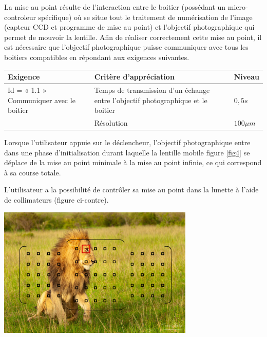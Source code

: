 La mise au point résulte de l'interaction entre le boitier (possédant un micro-controleur spécifique) où se situe
tout le traitement de numérisation de l'image (capteur CCD et programme
de mise au point) et l'objectif photographique qui permet de mouvoir la
lentille. Afin de réaliser correctement cette mise au point, il est
nécessaire que l'objectif photographique puisse communiquer avec tous
les boitiers compatibles en répondant aux exigences suivantes.

\begin{tabular}{|p{}|p{}|p{}|}
\hline 
\textbf{Exigence} & \textbf{Critère d'appréciation} & \textbf{Niveau} \\ 
\hline 
Id = « 1.1 » Communiquer avec le boitier & Temps de transmission d'un échange entre l'objectif photographique et le boitier & $0,5s$ \\ 
\cline{2-3}
& Résolution & $100\mu m$ \\ 
\hline 
\end{tabular} 


\begin{minipage}{0.4\textwidth}
Lorsque l'utilisateur appuie sur le déclencheur, l'objectif
photographique entre dans une phase d'initialisation durant laquelle la
lentille mobile figure \ref{fig4} se déplace de
la mise au point minimale à la mise au point infinie, ce qui correspond
à sa course totale.

L'utilisateur a la possibilité de contrôler sa mise au point dans la lunette à l'aide de collimateurs (figure ci-contre).
\end{minipage}
\begin{minipage}{0.6\textwidth}
\begin{center}
\includegraphics[width=0.7\textwidth]{images/collimateurs.jpg}
\end{center}
\end{minipage}

